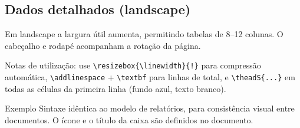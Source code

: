 \documentclass[a4paper, 11pt]{DPQISTfactsheet}
\begin{document}
\begin{landscape}

\section{Dados detalhados (landscape)}

Em landscape a largura útil aumenta, permitindo tabelas de 8–12 colunas.
O cabeçalho e rodapé acompanham a rotação da página.

\begin{table}[htbp]
    \centering
    \caption{Exemplo de tabela numérica grande em landscape}
    \label{tab:landscape}
\end{table}

Notas de utilização: use \verb|\resizebox{\linewidth}{!}| para compressão
automática, \verb|\addlinespace| + \verb|\textbf| para linhas de total, e
\verb|\theadS{...}| em todas as células da primeira linha (fundo azul, texto branco).

\end{landscape}


\newpage

\begin{istcaixa}{\faBullseye}{Exemplo}
Sintaxe idêntica ao modelo de relatórios, para consistência visual entre
documentos. O ícone e o título da caixa são definidos no documento.
\end{istcaixa}
\end{document}
